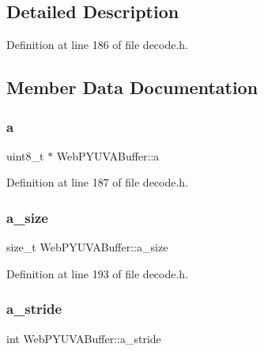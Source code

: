 \subsection{Detailed Description}


Definition at line 186 of file decode.\+h.



\subsection{Member Data Documentation}
\mbox{\label{struct_web_p_y_u_v_a_buffer_ad211dd3ea4fd3d129995e7a9d1bf2594}} 
\subsubsection{\texorpdfstring{a}{a}}
{\footnotesize\ttfamily uint8\+\_\+t $\ast$ Web\+P\+Y\+U\+V\+A\+Buffer\+::a}



Definition at line 187 of file decode.\+h.

\mbox{\label{struct_web_p_y_u_v_a_buffer_a1b229bd6f211fb1c579ec6ce26837aeb}} 
\subsubsection{\texorpdfstring{a\_size}{a\_size}}
{\footnotesize\ttfamily size\+\_\+t Web\+P\+Y\+U\+V\+A\+Buffer\+::a\+\_\+size}



Definition at line 193 of file decode.\+h.

\mbox{\label{struct_web_p_y_u_v_a_buffer_abe0f9157f126938a5081c5fd3ee88a9d}} 
\subsubsection{\texorpdfstring{a\_stride}{a\_stride}}
{\footnotesize\ttfamily int Web\+P\+Y\+U\+V\+A\+Buffer\+::a\+\_\+stride}



